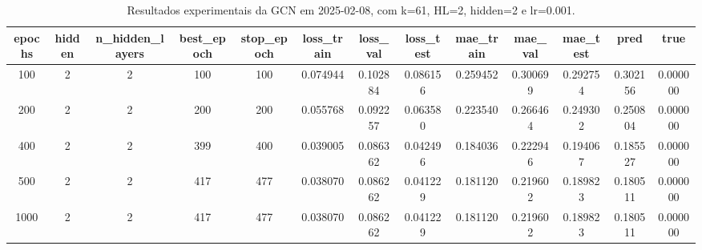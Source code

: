 \begin{table}[h]
\centering
\caption{Resultados experimentais da GCN em 2025-02-08, com k=61, HL=2, hidden=2 e lr=0.001.}
\label{tab:gcn_results_k61_hl2_h2_d20250208}
\begin{tabular}{ccccccccccccc}
\toprule
epochs & hidden & n\_hidden\_layers & best\_epoch & stop\_epoch & loss\_train & loss\_val & loss\_test & mae\_train & mae\_val & mae\_test & pred & true \\
\midrule
100 & 2 & 2 & 100 & 100 & 0.074944 & 0.102884 & 0.086156 & 0.259452 & 0.300699 & 0.292754 & 0.302156 & 0.000000 \\
200 & 2 & 2 & 200 & 200 & 0.055768 & 0.092257 & 0.063580 & 0.223540 & 0.266464 & 0.249302 & 0.250804 & 0.000000 \\
400 & 2 & 2 & 399 & 400 & 0.039005 & 0.086362 & 0.042496 & 0.184036 & 0.222946 & 0.194067 & 0.185527 & 0.000000 \\
500 & 2 & 2 & 417 & 477 & 0.038070 & 0.086262 & 0.041229 & 0.181120 & 0.219602 & 0.189823 & 0.180511 & 0.000000 \\
1000 & 2 & 2 & 417 & 477 & 0.038070 & 0.086262 & 0.041229 & 0.181120 & 0.219602 & 0.189823 & 0.180511 & 0.000000 \\
\bottomrule
\end{tabular}
\end{table}

